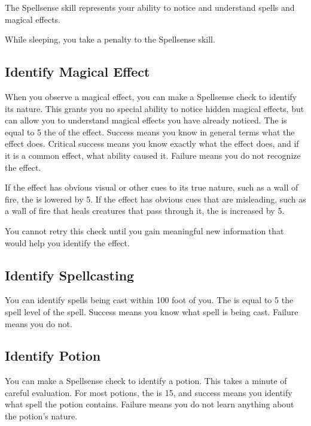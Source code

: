 \newpage
{}
        The Spellsense skill represents your ability to notice and understand spells and magical effects.

        While sleeping, you take a  penalty to the Spellsense skill.


    \subsection{Identify Magical Effect}
        When you observe a magical effect, you can make a Spellsense check to identify its nature.
        This grants you no special ability to notice hidden magical effects, but can allow you to understand magical effects you have already noticed.
        The  is equal to 5 \add the  of the effect.
        Success means you know in general terms what the effect does.
        Critical success means you know exactly what the effect does, and if it is a common effect, what ability caused it.
        Failure means you do not recognize the effect.

        If the effect has obvious visual or other cues to its true nature, such as a wall of fire, the  is lowered by 5.
        If the effect has obvious cues that are misleading, such as a wall of fire that heals creatures that pass through it, the  is increased by 5.

        You cannot retry this check until you gain meaningful new information that would help you identify the effect.

    \subsection{Identify Spellcasting}
        You can identify spells being cast within 100 foot  of you.
        The  is equal to 5 \add the spell level of the spell.
        Success means you know what spell is being cast.
        Failure means you do not.

    \subsection{Identify Potion}
        You can make a  Spellsense check to identify a potion.
        This takes a minute of careful evaluation.
        For most potions, the  is 15, and success means you identify what spell the potion contains.
        Failure means you do not learn anything about the potion's nature.

